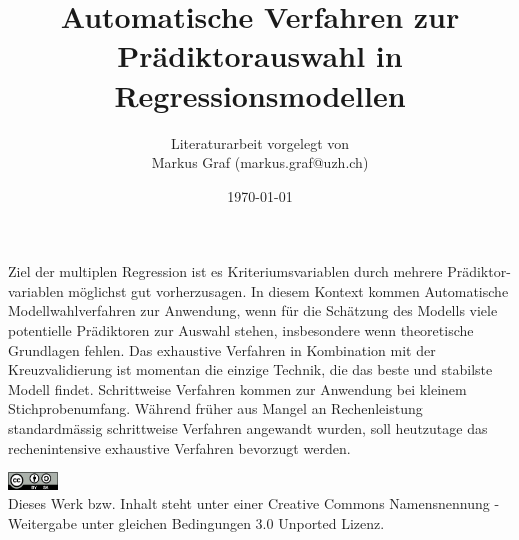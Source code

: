 \documentclass[german,12pt,doc]{apa}
\begin{document}
\begin{titlepage}

\title{Automatische Verfahren zur Prädiktorauswahl in Regressionsmodellen}
\author{Literaturarbeit vorgelegt von \\ Markus Graf (markus.graf@uzh.ch)}
\date{\today}

\maketitle
\end{titlepage}
\thispagestyle{empty}
Ziel der multiplen Regression ist es Kriteriumsvariablen durch mehrere Prädiktor- variablen möglichst gut vorherzusagen. In diesem Kontext kommen Automatische Modellwahlverfahren zur Anwendung, wenn für die Schätzung des Modells viele potentielle Prädiktoren zur Auswahl stehen, insbesondere wenn theoretische Grundlagen fehlen. Das exhaustive Verfahren in Kombination mit der Kreuzvalidierung ist momentan die einzige Technik, die das beste und stabilste Modell findet. Schrittweise Verfahren kommen zur Anwendung bei kleinem Stichprobenumfang. Während früher aus Mangel an Rechenleistung standardmässig schrittweise Verfahren angewandt wurden, soll heutzutage das rechenintensive exhaustive Verfahren bevorzugt werden.

\begin{center}
\includegraphics[width=0.1\textwidth]{cc_by_sa.jpg}\\
Dieses Werk bzw. Inhalt steht unter einer Creative Commons Namensnennung - Weitergabe unter gleichen Bedingungen 3.0 Unported Lizenz.
\end{center}
\setlength{\parindent}{0pt}
\newpage
\thispagestyle{empty}
\begin{spacing}{0.01}
\tableofcontents
\end{spacing}
\newpage



\end{document}
